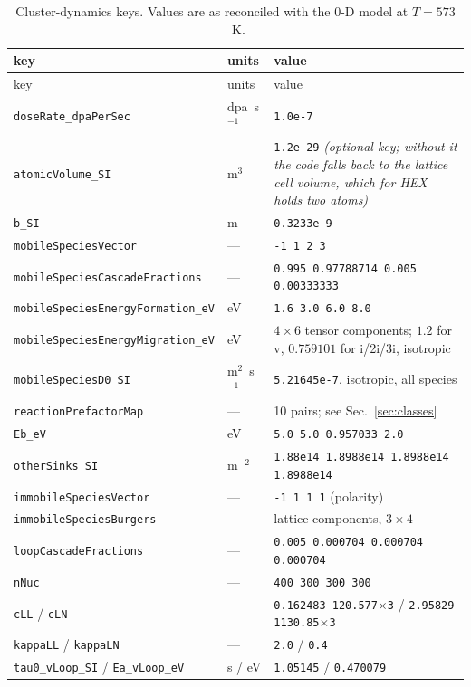 \documentclass[11pt]{article}
\newcommand{\code}[1]{\texttt{\small #1}}
\begin{document}
\begin{longtable}{@{}p{}p{}p{}@{}}
\caption{Cluster-dynamics keys. Values are as reconciled with the 0-D model at
$T=573$~K.}
\label{tab:modmat}\\
\toprule
key & units & value \\
\midrule
\endfirsthead
\toprule
key & units & value \\
\midrule
\endhead
\code{doseRate\_dpaPerSec} & dpa~s$^{-1}$ & \code{1.0e-7} \\
\code{atomicVolume\_SI} & m$^3$ & \code{1.2e-29} \emph{(optional key; without it
  the code falls back to the lattice \emph{cell} volume, which for HEX holds two
  atoms)} \\
\code{b\_SI} & m & \code{0.3233e-9} \\
\code{mobileSpeciesVector} & --- & \code{-1 1 2 3} \\
\code{mobileSpeciesCascadeFractions} & --- & \code{0.995 0.97788714 0.005 0.00333333} \\
\code{mobileSpeciesEnergyFormation\_eV} & eV & \code{1.6 3.0 6.0 8.0} \\
\code{mobileSpeciesEnergyMigration\_eV} & eV & $4\times6$ tensor components;
  $1.2$ for v, $0.759101$ for i/2i/3i, isotropic \\
\code{mobileSpeciesD0\_SI} & m$^2$~s$^{-1}$ & \code{5.21645e-7}, isotropic, all species \\
\code{reactionPrefactorMap} & --- & 10 pairs; see Sec.~\ref{sec:classes} \\
\code{Eb\_eV} & eV & \code{5.0 5.0 0.957033 2.0} \\
\code{otherSinks\_SI} & m$^{-2}$ & \code{1.88e14 1.8988e14 1.8988e14 1.8988e14} \\
\code{immobileSpeciesVector} & --- & \code{-1 1 1 1} (polarity) \\
\code{immobileSpeciesBurgers} & --- & lattice components, $3\times4$ \\
\code{loopCascadeFractions} & --- & \code{0.005 0.000704 0.000704 0.000704} \\
\code{nNuc} & --- & \code{400 300 300 300} \\
\code{cLL} / \code{cLN} & --- & \code{0.162483 120.577$\times$3} / \code{2.95829 1130.85$\times$3} \\
\code{kappaLL} / \code{kappaLN} & --- & \code{2.0} / \code{0.4} \\
\code{tau0\_vLoop\_SI} / \code{Ea\_vLoop\_eV} & s / eV & \code{1.05145} / \code{0.470079} \\

\end{longtable}
\end{document}
